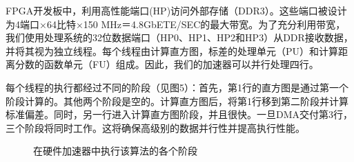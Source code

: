 FPGA开发板中，利用高性能端口(HP)访问外部存储（DDR3）。这些端口被设计为4端口×64比特×150 MHz＝4.8GbETE/SEC的最大带宽。为了充分利用带宽，我们使用处理系统的32位数据端口（HP0、HP1、HP2和HP3）从DDR接收数据，并将其视为独立线程。每个线程由计算直方图，标差的处理单元（PU）和计算距离分数的函数单元（FU）组成。因此，我们的加速器可以并行处理四行。

每个线程的执行都经过不同的阶段（见图5）：首先，第1行的直方图是通过第一个阶段计算的。其他两个阶段是空的。计算直方图后，将第1行移到第二阶段并计算标准偏差。同时，另一行进入计算直方图阶段，并且很快。一旦DMA交付第3行，三个阶段将同时工作。这将确保高级别的数据并行性并提高执行性能。
\begin{figure}
	\centering
	\caption{\song\wuhao 在硬件加速器中执行该算法的各个阶段}

\end{figure}







